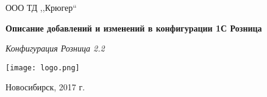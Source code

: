 \begin{titlepage}
  \begin{center}
    \large
  ООО ТД ,,Крюгер``

 
\vspace{2.25cm}

\textbf{Описание добавлений и изменений в конфигурации 1С Розница} 

\textit{Конфигурация Розница 2.2}
\vfill    
  
{\texttt{[image: logo.png]}}  
  
\end{center}
\vfill

\newlength{\ML}


\begin{center}
  Новосибирск, 2017 г.
\end{center}
\end{titlepage}